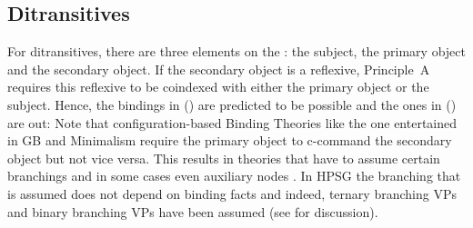 \documentclass[output=paper,biblatex,babelshorthands,newtxmath,draftmode,colorlinks,citecolor=brown]{langscibook}
\begin{document}
\subsection{Ditransitives}

For ditransitives, there are three elements on the \argstl: the subject, the primary object and the
secondary object. If the secondary object is a reflexive, Principle~A requires this reflexive to be
coindexed with either the primary object or the subject. Hence, the bindings in () are
predicted to be possible and the ones in () are out:
\eal
{}
\zl
\eal
{}
\zl
Note that configuration-based Binding Theories like the one entertained in GB and Minimalism require
the primary object to c-command the secondary object but not vice versa. This results in theories
that have to assume certain branchings and in some cases even auxiliary nodes
\citep[Section~4.4]{Adger2003a}. In HPSG the branching that is assumed does not depend on binding
facts and indeed, ternary branching VPs \citep[]{ps2} and binary branching VPs have been assumed (see
 for discussion).
\end{document}

